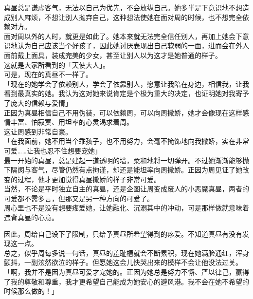 真昼总是谦虚客气，无法以自己为优先，不会放纵自己。她多半是下意识地不想造成别人麻烦，不想让别人抛弃自己，这种想法使她在面对周的时候，也不想完全依赖对方。\\

面对周以外的人时，就更是如此了。她本来就无法完全信任别人，再加上她会下意识地认为自己应该当个好孩子，因此她讨厌表现出自己软弱的一面，进而会在外人面前戴上面具，装成完美的少女，甚至让别人以为这才是她普通的样子。\\

这就是大家所看到的「天使大人」。\\

可是，现在的真昼不一样了。\\

「现在的她学会了依赖别人，学会了依靠别人，愿意让我陪在身边，相信我，让我看到最真实的她。我认为这对她来说肯定是个极为重大的决定，也证明她对我寄予了庞大的信赖与爱情」\\

正因为真昼相信自己不用伪装，可以依赖周，可以向周撒娇，她才会像现在这样感情丰富、怕寂寞、用坦率的心灵渴求着周。\\

这让周感到非常自豪。\\

「在我面前，她不用当个乖孩子，也不用努力，会毫不掩饰地向我撒娇，实在非常可爱……让我也忍不住想要宠她」\\

最一开始的真昼，总是建起一道透明的墙，柔和地将一切弹开。不过她渐渐能够抛下隔阂与客气，尽管仍然有点拘谨，却还是能坦率向周撒娇。正因为周见证了她改变的过程，他才更加觉得真昼撒娇的样子非常可爱。\\

当然，不论是平时独立自主的真昼，还是企图让周变成废人的小恶魔真昼，两者的可爱都不需多言，但那又是另一种方向的可爱了。\\

周心里也不是没有想要疼爱她，让她融化、沉溺其中的冲动，可是那样做就意味着违背真昼的心意。

因此，周给自己设下了限制，只给予真昼所希望得到的疼爱。不知道真昼有没有发现这一点。\\

总之，似乎周每多说一句话，真昼的羞耻槽就会不断累积，现在她满脸通红，浑身颤抖，一副泫然欲泣的样子。但愿她这会儿快哭出来的模样不会让他没法过关。\\

「啊，我并不是因为真昼可爱才宠她的。正因为她总是努力不懈、严以律己，赢得了我的尊敬和尊重，我才更希望自己能成为她安心的避风港。我不会在她不希望的时候那么做的！」\\

